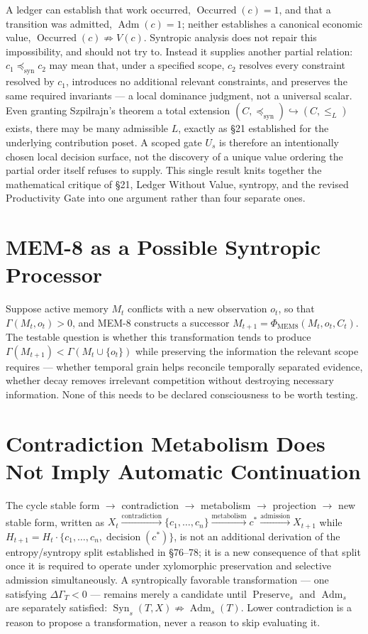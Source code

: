 \documentclass[12pt]{article}
\begin{document}
A ledger can establish that work occurred, $\operatorname{Occurred}(c)=1$, and that a transition was admitted, $\operatorname{Adm}(c)=1$; neither establishes a canonical economic value, $\operatorname{Occurred}(c)\not\Rightarrow V(c)$. Syntropic analysis does not repair this impossibility, and should not try to. Instead it supplies another partial relation: $c_1\preceq_{\mathrm{syn}}c_2$ may mean that, under a specified scope, $c_2$ resolves every constraint resolved by $c_1$, introduces no additional relevant constraints, and preserves the same required invariants — a local dominance judgment, not a universal scalar. Even granting Szpilrajn's theorem a total extension $(C,\preceq_{\mathrm{syn}})\hookrightarrow(C,\leq_L)$ exists, there may be many admissible $L$, exactly as \S21 established for the underlying contribution poset. A scoped gate $U_s$ is therefore an intentionally chosen local decision surface, not the discovery of a unique value ordering the partial order itself refuses to supply. This single result knits together the mathematical critique of \S21, Ledger Without Value, syntropy, and the revised Productivity Gate into one argument rather than four separate ones.

\section{MEM-8 as a Possible Syntropic Processor}

Suppose active memory $M_t$ conflicts with a new observation $o_t$, so that $\Gamma(M_t,o_t)>0$, and MEM-8 constructs a successor $M_{t+1}=\Phi_{\mathrm{MEM8}}(M_t,o_t,C_t)$. The testable question is whether this transformation tends to produce $\Gamma(M_{t+1})<\Gamma(M_t\cup\{o_t\})$ while preserving the information the relevant scope requires — whether temporal grain helps reconcile temporally separated evidence, whether decay removes irrelevant competition without destroying necessary information. None of this needs to be declared consciousness to be worth testing.

\section{Contradiction Metabolism Does Not Imply Automatic Continuation}

The cycle stable form $\to$ contradiction $\to$ metabolism $\to$ projection $\to$ new stable form, written as $X_t\xrightarrow{\text{contradiction}}\{c_1,\dots,c_n\}\xrightarrow{\text{metabolism}}c^\ast\xrightarrow{\text{admission}}X_{t+1}$ while $H_{t+1}=H_t\cdot\{c_1,\dots,c_n,\operatorname{decision}(c^\ast)\}$, is not an additional derivation of the entropy/syntropy split established in \S76–78; it is a new consequence of that split once it is required to operate under xylomorphic preservation and selective admission simultaneously. A syntropically favorable transformation — one satisfying $\Delta\Gamma_T<0$ — remains merely a candidate until $\operatorname{Preserve}_s$ and $\operatorname{Adm}_s$ are separately satisfied: $\operatorname{Syn}_s(T,X)\not\Rightarrow\operatorname{Adm}_s(T)$. Lower contradiction is a reason to propose a transformation, never a reason to skip evaluating it.
\end{document}
